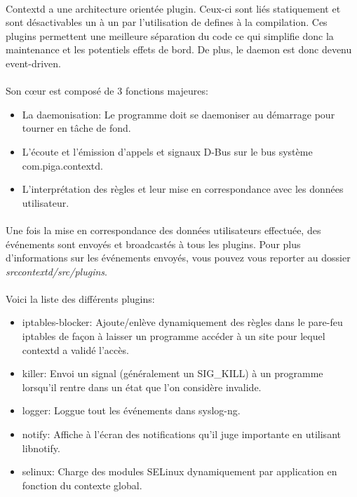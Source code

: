 		\paragraph*{}
			Contextd a une architecture orientée plugin. Ceux-ci sont liés statiquement et sont désactivables un à un par l'utilisation de defines à la compilation. Ces plugins permettent une meilleure séparation du code ce qui simplifie donc la maintenance et les potentiels effets de bord. De plus, le daemon est donc devenu event-driven.
		
		\paragraph*{}	
			Son cœur est composé de 3 fonctions majeures:
			\begin{itemize}
   				\item La daemonisation: Le programme doit se daemoniser au démarrage pour tourner en tâche de fond.
   				\item L'écoute et l'émission d'appels et signaux D-Bus sur le bus système com.piga.contextd.
   				\item L'interprétation des règles et leur mise en correspondance avec les données utilisateur.
   			\end{itemize}
   			
   		\paragraph*{}
   			Une fois la mise en correspondance des données utilisateurs effectuée, des événements sont envoyés et broadcastés à tous les plugins. Pour plus d'informations sur les événements envoyés, vous pouvez vous reporter au dossier \emph{srccontextd/src/plugins}.
   			
   		\paragraph*{}
   			Voici la liste des différents plugins:
   			\begin{itemize}
   				\item iptables-blocker: Ajoute/enlève dynamiquement des règles dans le pare-feu iptables de façon à laisser un programme accéder à un site pour lequel contextd a validé l'accès.
   				\item killer: Envoi un signal (généralement un SIG\_KILL) à un programme lorsqu'il rentre dans un état que l'on considère invalide.
   				\item logger: Loggue tout les événements dans syslog-ng.
   				\item notify: Affiche à l'écran des notifications qu'il juge importante en utilisant libnotify.
   				\item selinux: Charge des modules SELinux dynamiquement par application en fonction du contexte global.
   			\end{itemize}
   			   			
